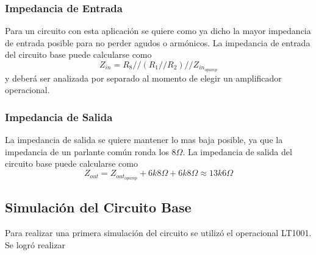 \subsubsection{Impedancia de Entrada}

Para un circuito con esta aplicación se quiere como ya dicho la mayor impedancia de entrada posible para no perder agudos o armónicos.
La impedancia de entrada del circuito base puede calcularse como
\[Z_{in} = R_8//(R_1//R_2)//Z_{in_{opamp}}\]
y deberá ser analizada por separado al momento de elegir un amplificador operacional.

\subsubsection{Impedancia de Salida}

La impedancia de salida se quiere mantener lo mas baja posible, ya que la impedancia de un parlante común ronda los $8\Omega$.
La impedancia de salida del circuito base puede calcularse como
\[ Z_{out} = Z_{out_{opamp}} + 6k8\Omega + 6k8\Omega \approx 13k6\Omega \]

\subsection{Simulación del Circuito Base}

Para realizar una primera simulación del circuito se utilizó el operacional LT1001. Se logró realizar
 
